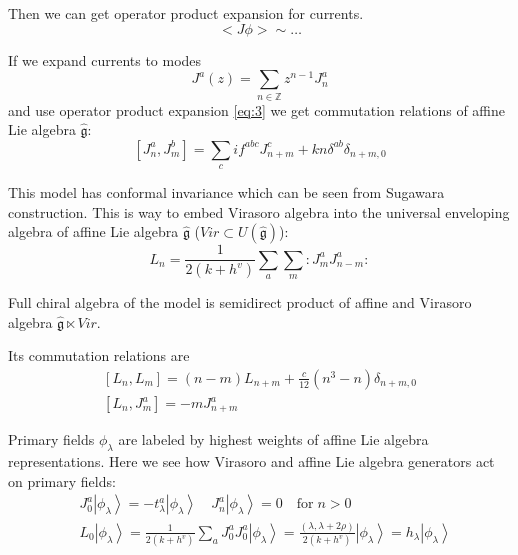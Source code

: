 \documentclass[12pt]{article}
\theoremstyle{definition}
\newcommand{\gfh}{\hat{\mathfrak{g}}}
\theoremstyle{definition} \newtheorem{Def}{Definition}
\begin{document}
 Then we can get operator product expansion for currents. 
 \begin{equation}
   \label{eq:3}
   <J\phi>\sim \dots
 \end{equation}

If we expand currents to modes
\begin{equation*}
  J^a(z)=\sum\limits_{n\in \mathbb Z}z^{n-1}J^a_n 
\end{equation*}
and use operator product expansion \eqref{eq:3} we get commutation relations of affine Lie algebra $\gfh$:
\begin{equation}
  \left[J^a_n,J^b_m\right]=\sum_c i f^{abc}J^c_{n+m}+kn\delta^{ab}\delta_{n+m,0} 
\end{equation}

This model has conformal invariance which can be seen from 
Sugawara construction. This is way to embed Virasoro algebra into the universal enveloping algebra of affine Lie algebra $\gfh$ ($Vir\subset U(\gfh)$):
\begin{equation}
  \label{eq:4}
  L_n=\frac{1}{2(k+h^v)}\sum\limits_a\sum\limits_m:J^a_m J^a_{n-m}:
\end{equation}
  
Full chiral algebra of the model is semidirect product of affine and Virasoro algebra $\gfh \ltimes Vir$. 

Its commutation relations are
  \begin{equation}
    \label{eq:92}
    \begin{aligned}
      \left[L_n,L_m\right]=(n-m)L_{n+m}+\frac{c}{12}(n^3-n)\delta_{n+m,0}\\
      \left[L_n,J^a_m\right]=-mJ^a_{n+m}
    \end{aligned}
  \end{equation}

Primary fields  $\phi_{\lambda}$ are labeled by highest weights of affine Lie algebra representations. Here we see how Virasoro and affine Lie algebra generators act on primary fields:
  \begin{equation*}
    \begin{aligned}
      & J_0^a\left|\phi_{\lambda}\right>=-t^a_{\lambda}\left|\phi_{\lambda}\right>  \quad    J^a_n\left|\phi_{\lambda}\right>=0 \quad \mbox{for}\; n>0 \\
      & L_0\left|\phi_{\lambda}\right>=\frac{1}{2(k+h^v)}\sum_aJ^a_0J^a_0\left|\phi_{\lambda}\right>=\frac{(\lambda,\lambda+2\rho)}{2(k+h^v)}\left|\phi_{\lambda}\right>=h_{\lambda} \left|\phi_{\lambda}\right>
    \end{aligned}
  \end{equation*}
\end{document}
